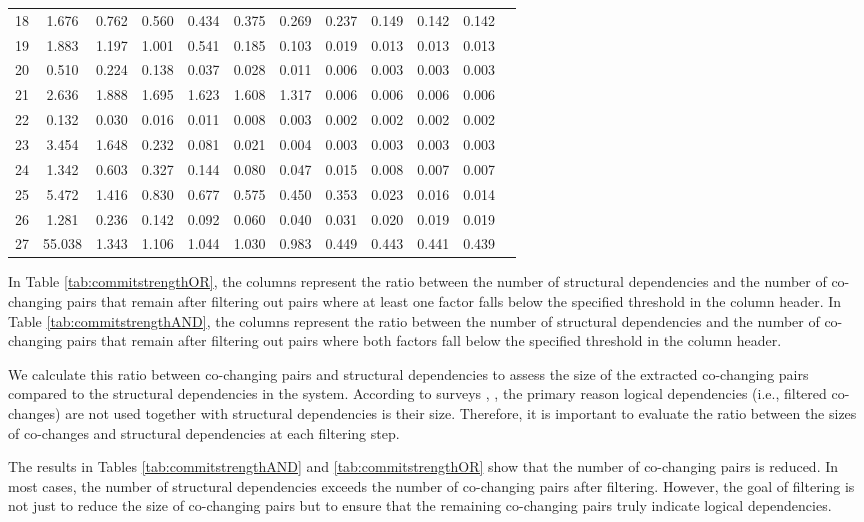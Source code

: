 \begin{table}[!h]
{\begin{tabular}{|c|cccccccccc|c|}
18 & 1.676 & 0.762 & 0.560 & 0.434 & 0.375 & 0.269 & 0.237 & 0.149 & 0.142 & 0.142 \\
19 & 1.883 & 1.197 & 1.001 & 0.541 & 0.185 & 0.103 & 0.019 & 0.013 & 0.013 & 0.013 \\
20 & 0.510 & 0.224 & 0.138 & 0.037 & 0.028 & 0.011 & 0.006 & 0.003 & 0.003 & 0.003 \\
21 & 2.636 & 1.888 & 1.695 & 1.623 & 1.608 & 1.317 & 0.006 & 0.006 & 0.006 & 0.006 \\
22 & 0.132 & 0.030 & 0.016 & 0.011 & 0.008 & 0.003 & 0.002 & 0.002 & 0.002 & 0.002 \\
23 & 3.454 & 1.648 & 0.232 & 0.081 & 0.021 & 0.004 & 0.003 & 0.003 & 0.003 & 0.003 \\
24 & 1.342 & 0.603 & 0.327 & 0.144 & 0.080 & 0.047 & 0.015 & 0.008 & 0.007 & 0.007 \\
25 & 5.472 & 1.416 & 0.830 & 0.677 & 0.575 & 0.450 & 0.353 & 0.023 & 0.016 & 0.014 \\
26 & 1.281 & 0.236 & 0.142 & 0.092 & 0.060 & 0.040 & 0.031 & 0.020 & 0.019 & 0.019 \\
27 & 55.038 & 1.343 & 1.106 & 1.044 & 1.030 & 0.983 & 0.449 & 0.443 & 0.441 & 0.439 \\
\hline
\end{tabular}
}
\end{table}

In Table \ref{tab:commitstrengthOR}, the columns represent the ratio between the number of structural dependencies and the number of co-changing pairs that remain after filtering out pairs where at least one factor falls below the specified threshold in the column header.
In Table \ref{tab:commitstrengthAND}, the columns represent the ratio between the number of structural dependencies and the number of co-changing pairs that remain after filtering out pairs where both factors fall below the specified threshold in the column header.

We calculate this ratio between co-changing pairs and structural dependencies to assess the size of the extracted co-changing pairs compared to the structural dependencies in the system. According to surveys \cite{Shtern:2012:CMS:2332427.2332428}, \cite{sar}, the primary reason logical dependencies (i.e., filtered co-changes) are not used together with structural dependencies is their size. Therefore, it is important to evaluate the ratio between the sizes of co-changes and structural dependencies at each filtering step.

The results in Tables \ref{tab:commitstrengthAND} and \ref{tab:commitstrengthOR} show that the number of co-changing pairs is reduced. In most cases, the number of structural dependencies exceeds the number of co-changing pairs after filtering. However, the goal of filtering is not just to reduce the size of co-changing pairs but to ensure that the remaining co-changing pairs truly indicate logical dependencies.

